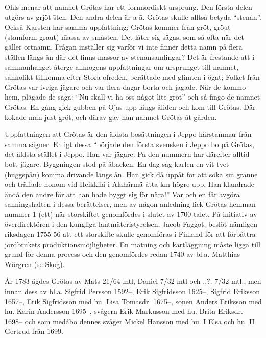 

Ohls menar att namnet Grötas har ett fornnordiskt ursprung. Den första delen utgörs av grjöt \= sten. Den andra delen är a \= å. Grötas skulle alltså betyda ``stenån''. Också Karsten har samma uppfattning; Grötas kommer från gröt, gröut (stamform graut) \= massa av småsten. Det låter sig sägas, som så ofta när det gäller ortnamn. Frågan inställer sig varför vi inte finner detta namn på flera ställen längs ån där det finns massor av stenansamlingar? Det är frestande att i sammanhanget återge allmogens uppfattningar om ursprunget till namnet, sannolikt tillkomna efter Stora ofreden, berättade med glimten i ögat;
 Folket från Grötas var ivriga jägare och var flera dagar borta och jagade. När de kommo hem, plägade de säga: ``Nu skall vi ha oss något lite gröt'' och så fingo de namnet Grötas.
 En gång gick gubben på Ojas upp längs åliden och kom till Grötas. Där kokade man just gröt, och därav gav han namnet Grötas åt gården.

Uppfattningen att Grötas är den äldsta bosättningen i Jeppo härstammar från samma sägner. Enligt dessa ``började den första svensken i Jeppo bo på Grötas, det äldsta stället i Jeppo. Han var jägare. På den nummern har därefter alltid bott jägare. Byggningen stod på åbacken. En dag såg karlen en vit tvet (huggspån) komma drivande längs ån. Han gick då uppåt för att söka sin granne och träffade honom vid Heikkilä i Alahärmä åtta km högre upp. Han klandrade ändå den andre för att han hade byggt sig för nära!'' Var och en får avgöra sanningshalten i dessa berättelser, men av någon anledning fick Grötas hemman nummer 1 (ett) när storskiftet genomfördes i slutet av 1700-talet. På initiativ av överdirektören i den kungliga lantmäteristyrelsen, Jacob Faggot, beslöt nämligen riksdagen 1755-56 att ett storskifte skulle genomföras i Finland för att förbättra jordbrukets produktionsmöjligheter. En mätning och kartläggning måste ligga till grund för denna process och den genomfördes redan 1740 av bl.a. Matthias Wörgren (se Skog).

År 1783 ägdes Grötas av Mats 21/64 mtl, Daniel 7/32 mtl och  ..?. 7/32 mtl., men innan dess av bl.a. Sigfrid Persson 1592--, Erik Sigfridsson 1625--, Sigfrid Eriksson  1657--, Erik Sigfridsson med hu. Lisa Tomasdr. 1675--, sonen  Anders Eriksson med hu. Karin Andersson 1695--, svågern Erik Markusson med hu. Brita Eriksdr. 1698-- och som medåbo dennes svåger Mickel Hansson med hu. I Elsa och hu. II Gertrud från 1699.


